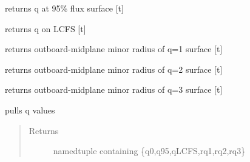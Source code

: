 \documentclass[letterpaper,10pt,english]{sphinxmanual}
\begin{document}
\begin{fulllineitems}
\begin{fulllineitems}
\end{fulllineitems}


\begin{fulllineitems}
\label{eqtools:eqtools.EFIT.EFITTree.getQ95}
returns q at 95\% flux surface {[}t{]}

\end{fulllineitems}


\begin{fulllineitems}
\label{eqtools:eqtools.EFIT.EFITTree.getQLCFS}
returns q on LCFS {[}t{]}

\end{fulllineitems}


\begin{fulllineitems}
\label{eqtools:eqtools.EFIT.EFITTree.getQ1Surf}
returns outboard-midplane minor radius of q=1 surface {[}t{]}

\end{fulllineitems}


\begin{fulllineitems}
\label{eqtools:eqtools.EFIT.EFITTree.getQ2Surf}
returns outboard-midplane minor radius of q=2 surface {[}t{]}

\end{fulllineitems}


\begin{fulllineitems}
\label{eqtools:eqtools.EFIT.EFITTree.getQ3Surf}
returns outboard-midplane minor radius of q=3 surface {[}t{]}

\end{fulllineitems}


\begin{fulllineitems}
\label{eqtools:eqtools.EFIT.EFITTree.getQs}
pulls q values
\begin{quote}\begin{description}
\item[{Returns}] \leavevmode
namedtuple containing \{q0,q95,qLCFS,rq1,rq2,rq3\}


\end{description}
\end{quote}
\end{fulllineitems}
\end{fulllineitems}
\end{document}
